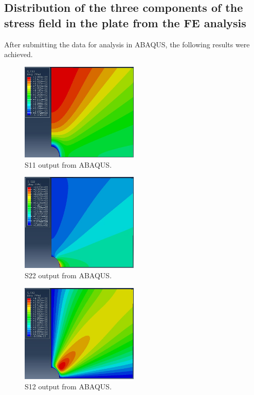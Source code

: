 \documentclass[11pt]{article}
\numberwithin{equation}{section}
\begin{document}
\subsection{Distribution of the three components of the stress field in the plate from the FE analysis}
After submitting the data for analysis in ABAQUS, the following results were achieved.
\begin{figure}[H]
    \centering
    \includegraphics[width = 0.5\textwidth]{./img/diagram2.jpg}
    \caption{S11 output from ABAQUS.}
\end{figure}
\begin{figure}[H]
    \centering
    \includegraphics[width = 0.5\textwidth]{./img/diagram3.jpg}
    \caption{S22 output from ABAQUS.}
\end{figure}
\begin{figure}[H]
    \centering
    \includegraphics[width = 0.5\textwidth]{./img/diagram4.jpg}
    \caption{S12 output from ABAQUS.}
\end{figure}
\end{document}
